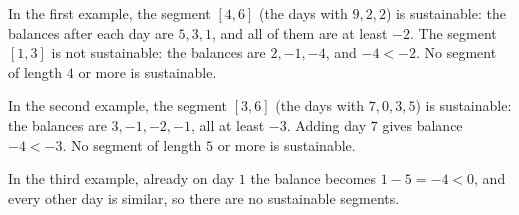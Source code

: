 In the first example, the segment $[4, 6]$ (the days with $9, 2, 2$) is sustainable: the balances after each day are $5, 3, 1$, and all of them are at least $-2$. The segment $[1, 3]$ is not sustainable: the balances are $2, -1, -4$, and $-4 < -2$. No segment of length $4$ or more is sustainable.

In the second example, the segment $[3, 6]$ (the days with $7, 0, 3, 5$) is sustainable: the balances are $3, -1, -2, -1$, all at least $-3$. Adding day $7$ gives balance $-4 < -3$. No segment of length $5$ or more is sustainable.

In the third example, already on day $1$ the balance becomes $1 - 5 = -4 < 0$, and every other day is similar, so there are no sustainable segments.